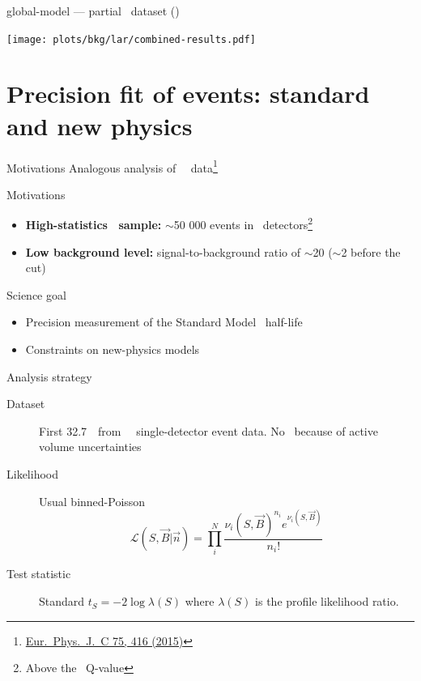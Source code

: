 \documentclass[10pt,aspectratio=169]{beamer}
\begin{document}
\begin{frame}[plain]{global-model --- partial \phasetwo\ dataset (\gexpophasetwobkg)}
  \begin{center}
    \texttt{[image: plots/bkg/lar/combined-results.pdf]}
  \end{center}
\end{frame}
\section{Precision fit of \texorpdfstring{\nnbb}{2nubb} events: standard and new physics}
\begin{frame}{Motivations}
  Analogous analysis of \gerda\ \phaseone\ data\footnote{\href{https://doi.org/10.1140/epjc/s10052-015-3627-y}{Eur.~Phys.~J.~C 75, 416 (2015)}}
  \begin{exampleblock}{Motivations}
    \begin{itemize}
      \item \textbf{High-statistics \nnbb\ sample:} $\sim$50 000 events in \bege\ detectors\footnote{Above the \Arl\ Q-value}
      \item \textbf{Low background level:} signal-to-background ratio of $\sim$20 ($\sim$2 before the cut)
    \end{itemize}
  \end{exampleblock}

  \begin{alertblock}{Science goal}
    \begin{itemize}
      \item Precision measurement of the Standard Model \nnbb\ half-life
      \item Constraints on new-physics models
    \end{itemize}
  \end{alertblock}
\end{frame}
\begin{frame}{Analysis strategy}
  \begin{description}
    \item[Dataset] First 32.7~\kgyr\ from \phasetwo\ \bege\ single-detector
      event data. No \scoax\ because of active volume uncertainties
    \item[Likelihood] Usual binned-Poisson
      \[
        \mathcal{L}(S, \vec{B} | \vec{n}) =
        \prod_i^{N} \frac{{\nu_i(S, \vec{B})}^{n_i} e^{\nu_i(S, \vec{B})}}{n_i!}
      \]
    \item[Test statistic] Standard $t_S = -2\log\lambda(S)$ where $\lambda(S)$
      is the profile likelihood ratio.
  \end{description}
\end{frame}
\end{document}
